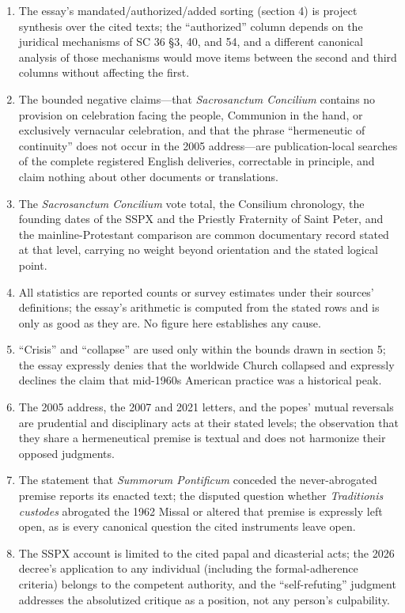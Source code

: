 \begin{enumerate}[leftmargin=1.45em,itemsep=0.25em]
\item The essay's mandated/authorized/added sorting (section 4) is project synthesis over the cited texts; the ``authorized'' column depends on the juridical mechanisms of SC 36 \S3, 40, and 54, and a different canonical analysis of those mechanisms would move items between the second and third columns without affecting the first.
\item The bounded negative claims---that \emph{Sacrosanctum Concilium} contains no provision on celebration facing the people, Communion in the hand, or exclusively vernacular celebration, and that the phrase ``hermeneutic of continuity'' does not occur in the 2005 address---are publication-local searches of the complete registered English deliveries, correctable in principle, and claim nothing about other documents or translations.
\item The \emph{Sacrosanctum Concilium} vote total, the Consilium chronology, the founding dates of the SSPX and the Priestly Fraternity of Saint Peter, and the mainline-Protestant comparison are common documentary record stated at that level, carrying no weight beyond orientation and the stated logical point.
\item All statistics are reported counts or survey estimates under their sources' definitions; the essay's arithmetic is computed from the stated rows and is only as good as they are. No figure here establishes any cause.
\item ``Crisis'' and ``collapse'' are used only within the bounds drawn in section 5; the essay expressly denies that the worldwide Church collapsed and expressly declines the claim that mid-1960s American practice was a historical peak.
\item The 2005 address, the 2007 and 2021 letters, and the popes' mutual reversals are prudential and disciplinary acts at their stated levels; the observation that they share a hermeneutical premise is textual and does not harmonize their opposed judgments.
\item The statement that \emph{Summorum Pontificum} conceded the never-abrogated premise reports its enacted text; the disputed question whether \emph{Traditionis custodes} abrogated the 1962 Missal or altered that premise is expressly left open, as is every canonical question the cited instruments leave open.
\item The SSPX account is limited to the cited papal and dicasterial acts; the 2026 decree's application to any individual (including the formal-adherence criteria) belongs to the competent authority, and the ``self-refuting'' judgment addresses the absolutized critique as a position, not any person's culpability.

\end{enumerate}
